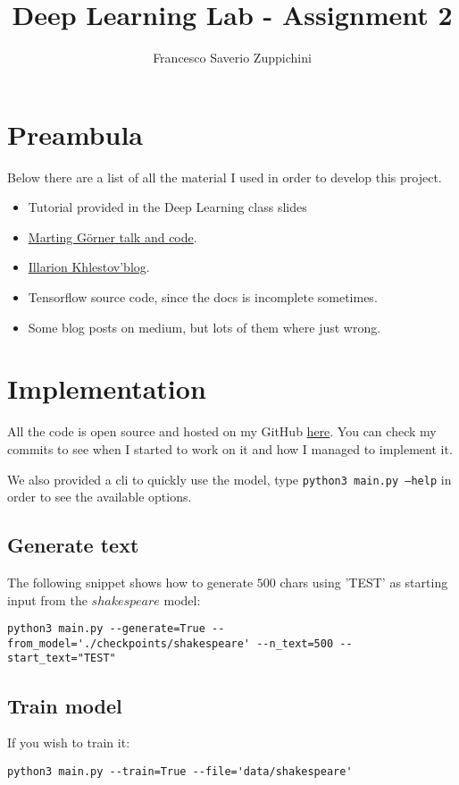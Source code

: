 \documentclass[11pt]{article}
\title{Deep Learning Lab - Assignment 2}
\author{Francesco Saverio Zuppichini}
\begin{document}
\maketitle
\section{Preambula}
Below there are a list of all the material I used in order to develop this project. 
\begin{itemize}
	\item Tutorial provided in the Deep Learning class slides
	\item \href{https://www.youtube.com/watch?v=vq2nnJ4g6N0}{Marting Görner talk and code}.
	\item \href{https://ikhlestov.github.io/pages/machine-learning/tensorflow-hints/}{Illarion Khlestov'blog}.
	\item Tensorflow source code, since the docs is incomplete sometimes.
	\item Some blog posts on medium, but lots of them where just wrong. 
 \end{itemize}
\section{Implementation}
All the code is open source and hosted on my GitHub \href{https://github.com/FrancescoSaverioZuppichini/LSTM-Text-Generator}{here}. You can check my commits to see when I started to work on it and how I managed to implement it.

We also provided a cli to quickly use the model, type \texttt{python3 main.py --help} in order to see the available options.
\subsection{Generate text}
The following snippet shows how to generate $500$ chars using 'TEST' as starting input from the $shakespeare$ model:
\begin{lstlisting}[breaklines=true]
python3 main.py --generate=True --from_model='./checkpoints/shakespeare' --n_text=500 --start_text="TEST"	
\end{lstlisting}
\subsection{Train model}
If you wish to train it:
\begin{lstlisting}[breaklines=true]
python3 main.py --train=True --file='data/shakespeare'	
\end{lstlisting}
\end{document}
